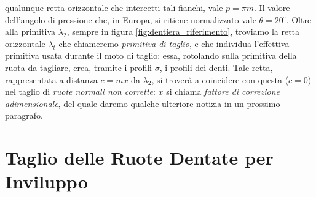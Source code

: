 qualunque retta orizzontale che intercetti tali fianchi, vale $p=\pi m$.
Il valore dell'angolo di pressione che, in Europa, si ritiene normalizzato
vale $\theta=20^{\circ}$.
Oltre alla primitiva $\lambda_2$, sempre in figura 
\ref{fig:dentiera_riferimento}, troviamo la retta orizzontale $\lambda_t$
che chiameremo {\em primitiva di taglio},
e che individua l'effettiva primitiva usata durante il moto di taglio:
essa, rotolando sulla primitiva della ruota da tagliare,
crea, tramite i profili $\sigma$, i profili dei denti.
Tale retta, rappresentata a distanza $c=mx$ 
da $\lambda_2$, si trover\`a a coincidere con questa ($c=0$) nel
taglio di {\em ruote normali non corrette}:
$x$ si chiama {\em fattore di correzione adimensionale}, del quale daremo qualche ulteriore notizia in
un prossimo paragrafo.

\section{Taglio delle Ruote Dentate per Inviluppo}

